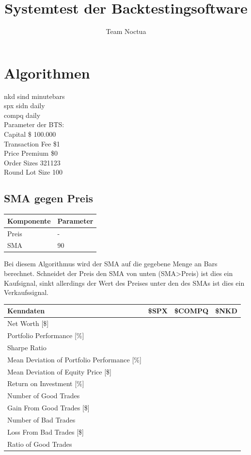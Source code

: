 \documentclass[11pt]{article} %
\title{Systemtest der Backtestingsoftware}
\author{Team Noctua}
\begin{document}
\maketitle

\section{Algorithmen}
nkd sind minutebars\\
spx sidn daily\\
compq daily\\
Parameter der BTS: \\
Capital \$ 100.000 \\
Transaction Fee \$1 \\ 
Price Premium \$0 \\
Order Sizes 321123 \\
Round Lot Size 100 \\
\newpage
\subsection{SMA gegen Preis}

\begin{center}
\begin{tabular}{ | p{4cm} | p{11cm} |}
\hline 
\textbf{Komponente} & \textbf{Parameter}\\  \hline
Preis & - \\ \hline
SMA & 90 \\ \hline
\end{tabular}
\end{center} 
Bei diesem Algorithmus wird der SMA auf die gegebene Menge an Bars berechnet. Schneidet der Preis den SMA von unten (SMA\textgreater Preis) ist dies ein Kaufsignal, sinkt allerdings der Wert des Preises unter den des SMAs ist dies ein Verkaufssignal. \\

\begin{center}
\begin{tabular}{ | p{5cm} | p{3cm} | p{3cm} | p{3cm} |}
\hline 
Kenndaten & \$SPX & \$COMPQ &  \$NKD \\ \hline
Net Worth [\$]&   & &  \\ \hline
Portfolio Performance [\%]& & &  \\ \hline
Sharpe Ratio& & &  \\ \hline
Mean Deviation of Portfolio Performance [\%]& & &  \\ \hline
Mean Deviation of Equity Price [\$]& & &  \\ \hline
Return on Investment [\%]& & &  \\ \hline
Number of Good Trades& & &  \\ \hline
Gain From Good Trades [\$]& & &  \\ \hline
Number of Bad Trades& & &  \\ \hline
Loss From Bad Trades [\$]& & &  \\ \hline
Ratio of Good Trades& & &  \\ \hline
\end{tabular}
\end{center}
\end{document}
